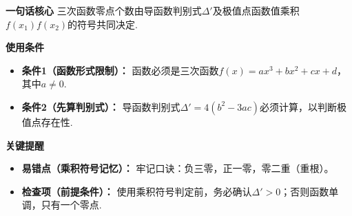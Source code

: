 \begin{summarybox}
	\textbf{\textcolor{CSummary}{一句话核心}}
	三次函数零点个数由导函数判别式\(\Delta'\)及极值点函数值乘积\(f(x_1)f(x_2)\)的符号共同决定.

	\medskip
	\textbf{\textcolor{CSummary}{使用条件}}
	\begin{itemize}[leftmargin=*, itemsep=0.5em, topsep=0.4em]
		\item \textbf{条件1（函数形式限制）：} 函数必须是三次函数\(f(x)=ax^3+bx^2+cx+d\)，其中\(a\neq0\).
		\item \textbf{条件2（先算判别式）：} 导函数判别式\(\Delta'=4(b^2-3ac)\)必须计算，以判断极值点存在性.
	\end{itemize}

	\medskip
	\textbf{\textcolor{CSummary}{关键提醒}}
	\begin{itemize}[leftmargin=*, itemsep=0.5em, topsep=0.4em]
		\item \textbf{易错点（乘积符号记忆）：} 牢记口诀：负三零，正一零，零二重（重根）。
		\item \textbf{检查项（前提条件）：} 使用乘积符号判定前，务必确认\(\Delta'>0\)；否则函数单调，只有一个零点.
	\end{itemize}

\end{summarybox}
